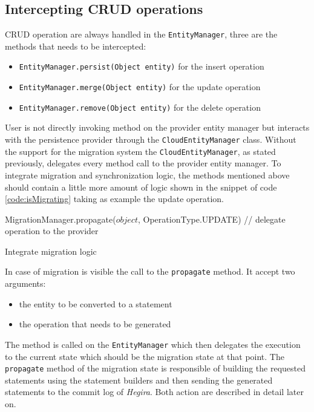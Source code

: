 \subsection{Intercepting CRUD operations}
CRUD operation are always handled in the \texttt{EntityManager}, three are the methods that needs to be intercepted:
\begin{itemize}
\item \texttt{EntityManager.persist(Object entity)} for the insert operation
\item \texttt{EntityManager.merge(Object entity)} for the update operation
\item \texttt{EntityManager.remove(Object entity)} for the delete operation
\end{itemize}
\noindent User is not directly invoking method on the provider entity manager but interacts with the persistence provider through the \texttt{CloudEntityManager} class. Without the support for the migration system the \texttt{CloudEntityManager}, as stated previously, delegates every method call to the provider entity manager.
To integrate migration and synchronization logic, the methods mentioned above should contain a little more amount of logic shown in the snippet of code \ref{code:isMigrating} taking as example the update operation.

\begin{algorithm}[h]
  \begin{algorithmic}[1]
        \State MigrationManager.propagate($object$, OperationType.UPDATE)
      \Else
        \State // delegate operation to the provider
      \EndIf
    \EndProcedure
  \end{algorithmic}	
  \caption{Integrate migration logic}
  \label{code:isMigrating}
\end{algorithm}

\noindent In case of migration is visible the call to the \texttt{propagate} method. It accept two arguments:
\begin{itemize}
\item the entity to be converted to a statement
\item the operation that needs to be generated
\end{itemize}
The method is called on the \texttt{EntityManager} which then delegates the execution to the current state which should be the migration state at that point. The \texttt{propagate} method of the migration state is responsible of building the requested statements using the statement builders and then sending the generated statements to the commit log of \textit{Hegira}. Both action are described in detail later on.

